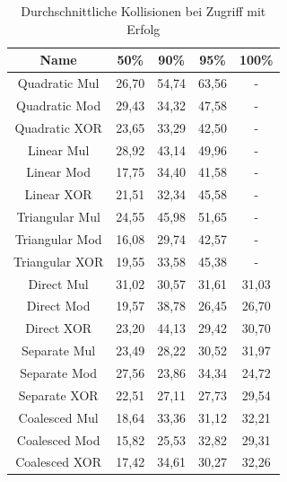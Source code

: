\begin{table}[h!]
\begin{tabular}{c|cccc}
    Name & 50\% & 90\% & 95\% & 100\% \\
    \hline
    Quadratic Mul & 26,70 & 54,74 & 63,56 & - \\
    Quadratic Mod & 29,43 & 34,32 & 47,58 & - \\
    Quadratic XOR & 23,65 & 33,29 & 42,50 & - \\
    \hline
    Linear Mul & 28,92 & 43,14 & 49,96 & - \\
    Linear Mod & 17,75 & 34,40 & 41,58 & - \\
    Linear XOR & 21,51 & 32,34 & 45,58 & - \\
    \hline
    Triangular Mul & 24,55 & 45,98 & 51,65 & - \\
    Triangular Mod & 16,08 & 29,74 & 42,57 & - \\
    Triangular XOR & 19,55 & 33,58 & 45,38 & - \\
    \hline
    Direct Mul & 31,02 & 30,57 & 31,61 & 31,03 \\
    Direct Mod & 19,57 & 38,78 & 26,45 & 26,70 \\
    Direct XOR & 23,20 & 44,13 & 29,42 & 30,70 \\
    \hline
    Separate Mul & 23,49 & 28,22 & 30,52 & 31,97 \\
    Separate Mod & 27,56 & 23,86 & 34,34 & 24,72 \\
    Separate XOR & 22,51 & 27,11 & 27,73 & 29,54 \\
    \hline
    Coalesced Mul & 18,64 & 33,36 & 31,12 & 32,21 \\
    Coalesced Mod & 15,82 & 25,53 & 32,82 & 29,31 \\
    Coalesced XOR & 17,42 & 34,61 & 30,27 & 32,26 \\
\end{tabular}
\centering
\caption{Durchschnittliche Kollisionen bei Zugriff mit Erfolg}
\end{table}
\FloatBarrier

